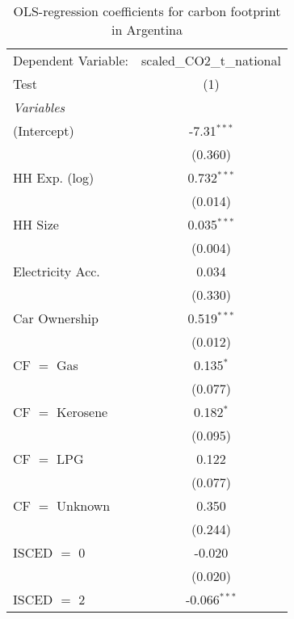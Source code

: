 
\begin{table}[htbp!]
   \centering
   \small
   \begin{adjustbox}{width = 1\textwidth, max height = 0.95\textheight, center}
      \begin{threeparttable}[b]
         \caption{\label{tab:OLS_2_ARG} OLS-regression coefficients for carbon footprint in Argentina}
         \begin{tabular}{lc}
            \tabularnewline \midrule \midrule
            Dependent Variable: & scaled\_CO2\_t\_national\\     
            Test                & (1)\\  
            \midrule
            \emph{Variables}\\
            (Intercept)         & -7.31$^{***}$\\   
                                & (0.360)\\   
            HH Exp. (log)       & 0.732$^{***}$\\   
                                & (0.014)\\   
            HH Size             & 0.035$^{***}$\\   
                                & (0.004)\\   
            Electricity Acc.    & 0.034\\   
                                & (0.330)\\   
            Car Ownership       & 0.519$^{***}$\\   
                                & (0.012)\\   
            CF $=$ Gas          & 0.135$^{*}$\\   
                                & (0.077)\\   
            CF $=$ Kerosene     & 0.182$^{*}$\\   
                                & (0.095)\\   
            CF $=$ LPG          & 0.122\\   
                                & (0.077)\\   
            CF $=$ Unknown      & 0.350\\   
                                & (0.244)\\   
            ISCED $=$ 0         & -0.020\\   
                                & (0.020)\\   
            ISCED $=$ 2         & -0.066$^{***}$\\   

\end{tabular}
\end{threeparttable}
\end{adjustbox}
\end{table}
